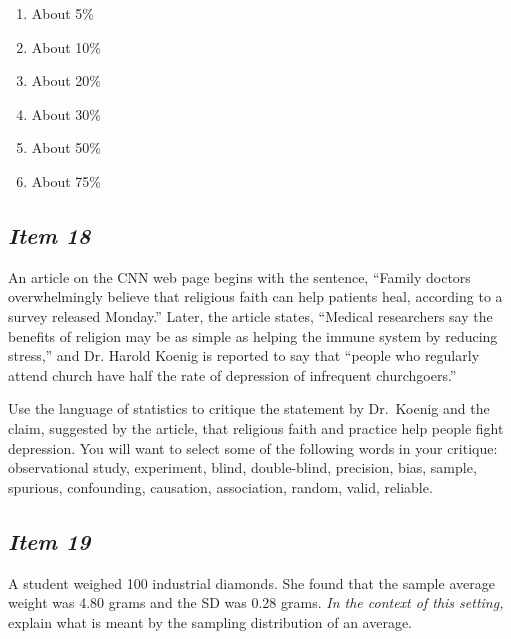 \begin{enumerate}[leftmargin=1cm, itemsep=.1em]


\item About 5\%


\item About 10\%


\item About 20\%


\item About 30\%


\item About 50\%


\item About 75\%


\end{enumerate}








\subsection{\textbf{\textit{Item 18}}}


An article on the CNN web page begins with the sentence, ``Family doctors overwhelmingly believe that religious faith can help patients heal, according to a survey released Monday.'' Later, the article states, ``Medical researchers say the benefits of religion may be as simple as helping the immune system by reducing stress,'' and Dr. Harold Koenig is reported to say that ``people who regularly attend church have half the rate of depression of infrequent churchgoers.''





Use the language of statistics to critique the statement by Dr.\ Koenig and the claim, suggested by the article, that religious faith and practice help people fight depression. You will want to select some of the following words in your critique: observational study, experiment, blind, double-blind, precision, bias, sample, spurious, confounding, causation, association, random, valid, reliable.





\subsection{\textbf{\textit{Item 19}}}


A student weighed 100 industrial diamonds. She found that the sample average weight was 4.80 grams and the SD was 0.28 grams. \textit{In the context of this setting,} explain what is meant by the sampling distribution of an average.





